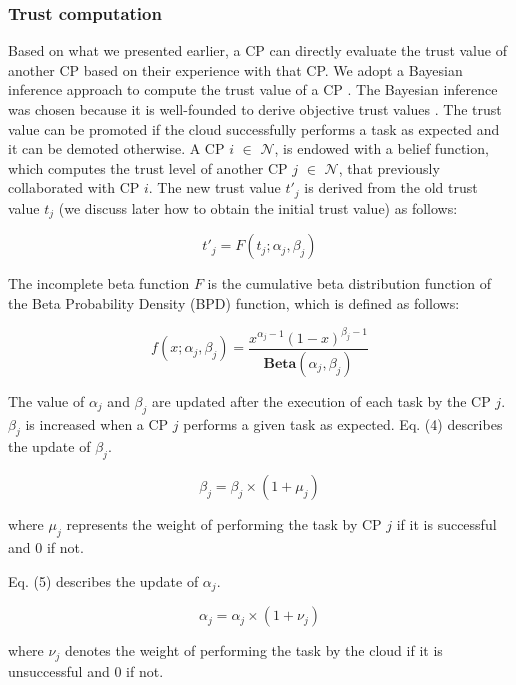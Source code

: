 \documentclass[preprint]{elsarticle}
\theoremstyle{definition}
\theoremstyle{remark}
\theoremstyle{property}
\begin{document}
\subsubsection{Trust computation}
Based on what we presented earlier, a CP can directly evaluate the trust value of another CP based on their experience with that CP. We adopt
a Bayesian inference approach to compute the trust value of a CP \cite{josang2002beta}. The Bayesian inference was chosen because it is
well-founded to derive objective trust values \cite{yahyaoui2012trust}. The trust value can be promoted if the
cloud successfully performs a task as expected and it can be demoted otherwise. A CP $i$ $\in$ $\mathcal{N}$, is endowed with a belief function, which computes the trust level of another CP $j$ $\in$ $\mathcal{N}$, that previously collaborated with CP $i$. The
new trust value $t'_{j}$ is derived from the old trust value $t_{j}$ (we discuss later how to obtain the initial trust value) as follows:

\begin{equation}
t'_{j}=F(t_{j};\alpha_{j},\beta_{j})
\end{equation}

The incomplete beta function $F$ is the cumulative beta distribution function
of the Beta Probability Density (BPD) function, which is defined as follows:

\begin{equation}
f(x;\alpha_{j},\beta_{j})=\frac{x^{\alpha_{j}-1}(1-x)^{\beta_{j}-1}}{\mathbf{Beta}(\alpha_{j},\beta_{j})}
\end{equation}

The value of $\alpha_{j}$ and
$\beta_{j}$ are updated after the execution of each task
by the CP $j$. $\beta_{j}$ is increased when a CP $j$
performs a given task as expected. Eq. (4) describes the
update of $\beta_{j}$.

\begin{equation}
\beta_{j} = \beta_{j} \times (1+\mu_{j})
\end{equation}

where $\mu_{j}$ represents the weight of performing the task by
CP $j$ if it is successful and 0 if not.

Eq. (5) describes the update of $\alpha_{j}$.

\begin{equation}
\alpha_{j} = \alpha_{j} \times (1+\nu_{j})
\end{equation}

where $\nu_{j}$ denotes the weight of performing the task by the
cloud if it is unsuccessful and 0 if not.
\end{document}
